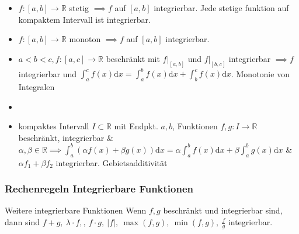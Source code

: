 \documentclass[a4paper]{article}
\newcommand\R{\ensuremath{\mathbb{R}}}
\begin{document}
\begin{itemize}[leftmargin=4.5mm, topsep=1pt, parsep=1pt]
    \item $f: [a, b] \to \R$ stetig $\implies f$ auf $[a,b]$ integrierbar.
          \tiny \color{gray} Jede stetige funktion auf kompaktem Intervall ist integrierbar. \normalsize \color{black} 
    \item $f: [a, b] \to \R$ monoton $\implies f$ auf $[a,b]$ integrierbar.
    \item $a < b < c, f: [a, c] \to \R$ beschränkt mit $f|_{[a,b]}$ und $f|_{[b,c]}$ integrierbar $\implies f$ integrierbar und $\int_{a}^{c} f(x) \mathrm{d}x = \int_{a}^{b} f(x) \mathrm{d}x + \int_{b}^{c} f(x) \mathrm{d}x$.
          \tiny \color{gray} Monotonie von Integralen \normalsize \color{black}
    \item
    \item kompaktes Intervall $I \subset \R$ mit Endpkt. $a,b$, Funktionen $f, g : I \to \R$ beschränkt, integrierbar \& $\alpha, \beta \in \R \implies \int_{a}^{b} (\alpha f(x) + \beta g(x)) \mathrm{d}x = \alpha \int_{a}^{b} f(x) \mathrm{d}x + \beta \int_{a}^{b} g(x)\mathrm{d}x$ \& $\alpha f_1 + \beta f_2$ integrierbar.
          \tiny \color{gray} Gebietsadditivität \normalsize \color{black} 
  \end{itemize}

\subsubsection{Rechenregeln Integrierbare Funktionen}
\begin{subbox}{Weitere integrierbare Funktionen}
  Wenn $f,g$ beschränkt und integrierbar sind, dann sind
  $f+g, \ \lambda \cdot f, , \ f \cdot g, \ |f|, \ \max(f,g), \ \min(f,g), \ \frac{f}{g}$ integrierbar.
\end{subbox}
\end{document}
